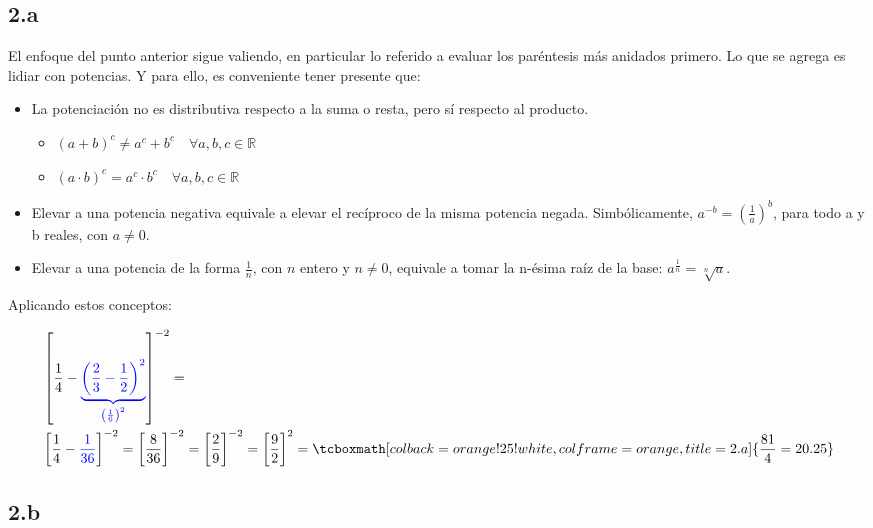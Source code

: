 \documentclass{article}
\begin{document}
\subsection*{2.a}
\label{subsec:2.a}

El enfoque del punto anterior sigue valiendo, en particular lo referido a evaluar los paréntesis más anidados primero. Lo que se agrega es lidiar con potencias. Y para ello, es conveniente tener presente que:

\begin{itemize}
\item La potenciación no es distributiva respecto a la suma o resta, pero sí respecto al producto.
\begin{itemize}
\renewcommand{\labelitemii}{$\diamond$}
\item $\left(a + b\right)^c \neq a^c + b^c \quad \forall a,b,c \in \mathbb{R}$
\item $\left(a \cdot b\right)^c = a^c \cdot b^c \quad \forall a,b,c \in \mathbb{R}$
\end{itemize}
\item Elevar a una potencia negativa equivale a elevar el recíproco de la misma potencia negada. Simbólicamente, $a^{-b} = \left( \frac{1}{a} \right)^b$, para todo a y b reales, con $a \neq 0$.
\item Elevar a una potencia de la forma $\frac{1}{n}$, con $n$ entero y $n \neq 0$, equivale a tomar la n-ésima raíz de la base: $a^{\frac{1}{n}} = \sqrt[n]{a}$.
\end{itemize}

Aplicando estos conceptos:

\begin{subequations}
\begin{align}
&\left[ \frac{1}{4} - \textcolor{blue}{ \underbrace{ \left( \frac{2}{3} - \frac{1}{2} \right)^2 }_{\left( \frac{1}{6} \right)^2 }} \right]^{-2} = \\
&\left[ \frac{1}{4} - \textcolor{blue}{ \frac{1}{36} } \right]^{-2} = \left[ \frac{8}{36} \right]^{-2} = \left[ \frac{2}{9} \right]^{-2} = \left[ \frac{9}{2} \right]^2 = \tcboxmath[colback=orange!25!white,colframe=orange, title=2.a] { \frac{81}{4} = 20.25 }
\end{align}
\end{subequations}

\subsection*{2.b}
\label{subsec:2.b}
\end{document}
